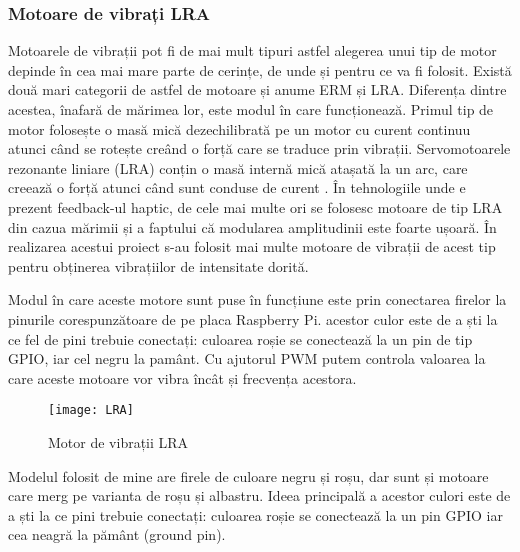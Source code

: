 \documentclass[../IoMusT.tex]{subfiles}
\begin{document}
\subsubsection{Motoare de vibrați LRA}
Motoarele de vibrații pot fi de mai mult tipuri astfel alegerea unui tip de motor depinde în cea mai mare parte de cerințe, de unde și pentru ce va fi folosit. Există două mari categorii de astfel de motoare și anume ERM și LRA. Diferența dintre acestea, înafară de mărimea lor, este modul în care funcționează. Primul tip de motor folosește o masă mică dezechilibrată pe un motor cu curent continuu atunci când se rotește creând o forță care se traduce prin vibrații. Servomotoarele rezonante liniare (LRA) conțin o masă internă mică atașată la un arc, care creează o forță atunci când sunt conduse de curent \cite{LRA}. În tehnologiile unde e prezent feedback-ul haptic, de cele mai multe ori se folosesc motoare de tip LRA din cazua mărimii și a faptului că modularea amplitudinii este foarte ușoară. În realizarea acestui proiect s-au folosit mai multe motoare de vibrații de acest tip pentru obținerea vibrațiilor de intensitate dorită.
\\
\par Modul în care aceste motore sunt puse în funcțiune este prin conectarea firelor la pinurile corespunzătoare de pe placa Raspberry Pi. 
acestor culor este de a ști la ce fel de pini trebuie conectați: culoarea roșie se conectează la un pin de tip GPIO, iar cel negru la pamânt. Cu ajutorul PWM putem controla valoarea la care aceste motoare vor vibra încât și frecvența acestora.
\begin{figure}[h]
\centering
\texttt{[image: LRA]}
\caption{Motor de vibrații LRA}
\end{figure}
Modelul folosit de mine are firele de culoare negru și roșu, dar sunt și motoare care merg pe varianta de roșu și albastru. Ideea principală a acestor culori este de a ști la ce pini trebuie conectați: culoarea roșie se conectează la un pin GPIO iar cea neagră la pământ (ground pin).
\end{document}
